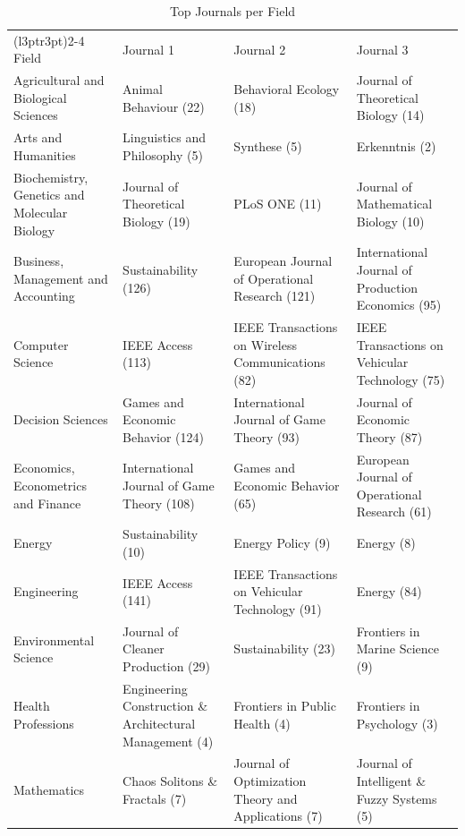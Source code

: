 \documentclass[
  12pt,
]{article}
\begin{document}
\begin{table}

\caption{\label{tab:journal_field_dist_tbl}Top Journals per Field}
\centering
\fontsize{10}{12}\selectfont
\begin{tabular}[t]{>{\raggedright\arraybackslash}p{4cm}>{\raggedright\arraybackslash}p{4cm}>{\raggedright\arraybackslash}p{4cm}>{\raggedright\arraybackslash}p{4cm}}
\toprule
\multicolumn{1}{c}{ } & \multicolumn{3}{c}{Top Journals per Field (Descending Order)} \\
\cmidrule(l{3pt}r{3pt}){2-4}
Field & Journal 1 & Journal 2 & Journal 3\\
\midrule
Agricultural and Biological Sciences & Animal Behaviour (22) & Behavioral Ecology (18) & Journal of Theoretical Biology (14)\\
Arts and Humanities & Linguistics and Philosophy (5) & Synthese (5) & Erkenntnis (2)\\
Biochemistry, Genetics and Molecular Biology & Journal of Theoretical Biology (19) & PLoS ONE (11) & Journal of Mathematical Biology (10)\\
Business, Management and Accounting & Sustainability (126) & European Journal of Operational Research (121) & International Journal of Production Economics (95)\\
Computer Science & IEEE Access (113) & IEEE Transactions on Wireless Communications (82) & IEEE Transactions on Vehicular Technology (75)\\
Decision Sciences & Games and Economic Behavior (124) & International Journal of Game Theory (93) & Journal of Economic Theory (87)\\
Economics, Econometrics and Finance & International Journal of Game Theory (108) & Games and Economic Behavior (65) & European Journal of Operational Research (61)\\
Energy & Sustainability (10) & Energy Policy (9) & Energy (8)\\
Engineering & IEEE Access (141) & IEEE Transactions on Vehicular Technology (91) & Energy (84)\\
Environmental Science & Journal of Cleaner Production (29) & Sustainability (23) & Frontiers in Marine Science (9)\\
Health Professions & Engineering Construction \& Architectural Management (4) & Frontiers in Public Health (4) & Frontiers in Psychology (3)\\
Mathematics & Chaos Solitons \& Fractals (7) & Journal of Optimization Theory and Applications (7) & Journal of Intelligent \& Fuzzy Systems (5)\\

\end{tabular}
\end{table}
\end{document}
